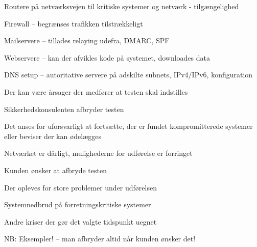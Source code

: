 \documentclass[Screen16to9,17pt]{foils}
\begin{document}


\begin{list2}
\item Routere på netværksvejen til kritiske systemer og netværk -
  tilgængelighed
\item Firewall -- begrænses trafikken tilstrækkeligt
\item Mailservere -- tillades relaying udefra, DMARC, SPF
\item Webservere -- kan der afvikles kode på systemet, downloades data
\item DNS setup -- autoritative servere på adskilte subnets, IPv4/IPv6, konfiguration
\end{list2}


\begin{list1}
\item Der kan være årsager der medfører at testen skal indstilles
\item Sikkerhedskonsulenten afbryder testen
\begin{list2}
\item Det anses for uforsvarligt at fortsætte, der er fundet
  kompromitterede systemer eller beviser der kan ødelægges
\item Netværket er dårligt, mulighederne for udførelse er forringet
\end{list2}
\item Kunden ønsker at afbryde testen
\begin{list2}
\item Der opleves for store problemer under udførelsen
\item Systemnedbrud på forretningskritiske systemer
\item Andre kriser der gør det valgte tidspunkt uegnet
\end{list2}
\item NB: Eksempler! -- man afbryder altid når kunden ønsker det!
\end{list1}

\end{document}
